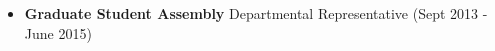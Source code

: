 \documentclass[line,margin,10pt]{res}
\begin{document}
\begin{resume}
\begin{itemize}[leftmargin=-2pt]
\item[]\textbf{Graduate Student Assembly} Departmental Representative (Sept 2013 - June 2015)

\end{itemize}
 

\end{resume}
\end{document}
